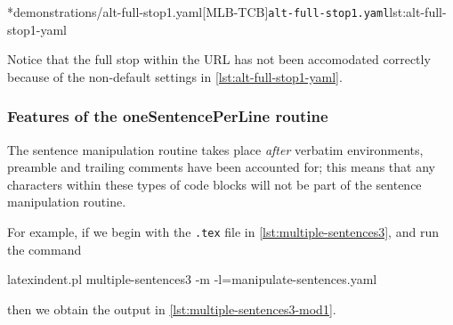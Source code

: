 	\begin{adjustwidth}{-3.5cm}{-1.5cm}
		\begin{minipage}{.6\linewidth}
		\end{minipage}
		\hfill
		\begin{minipage}{.4\linewidth}
			\cmhlistingsfromfile[style=yaml-LST]*{demonstrations/alt-full-stop1.yaml}[MLB-TCB]{\texttt{alt-full-stop1.yaml}}{lst:alt-full-stop1-yaml}
		\end{minipage}
	\end{adjustwidth}

	Notice that the full stop within the URL has not been accomodated correctly because of
	the non-default settings in \cref{lst:alt-full-stop1-yaml}.

\subsubsection{Features of the oneSentencePerLine routine}
	The sentence manipulation routine takes place \emph{after} verbatim
	environments, preamble and trailing comments have been accounted for; this means that any
	characters within these types of code blocks will not be part of the sentence
	manipulation routine.

	For example, if we begin with the \texttt{.tex} file in
	\cref{lst:multiple-sentences3}, and run the command
	\begin{commandshell}
latexindent.pl multiple-sentences3 -m -l=manipulate-sentences.yaml
	\end{commandshell}
	then we obtain the output in \cref{lst:multiple-sentences3-mod1}. 

